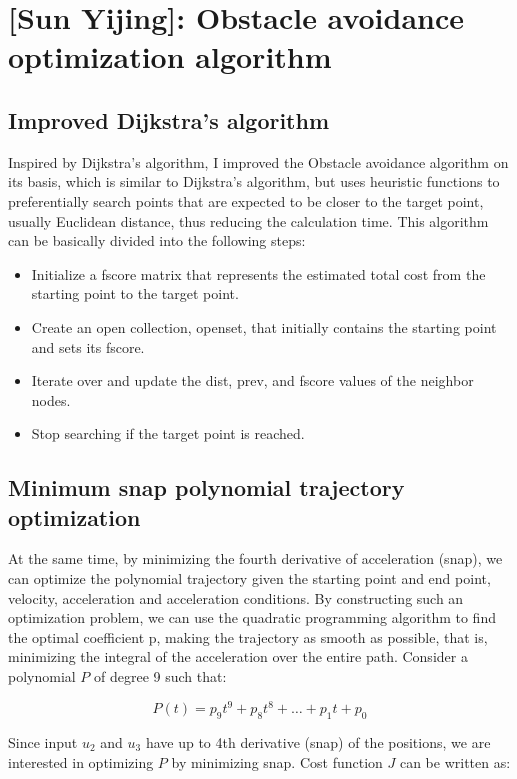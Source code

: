 \documentclass[12pt]{article}
\begin{document}
\section{[Sun Yijing]: Obstacle avoidance optimization algorithm}
\subsection{Improved Dijkstra's algorithm}

Inspired by Dijkstra's algorithm, I improved the Obstacle avoidance algorithm on its basis, which is similar to Dijkstra's algorithm, but uses heuristic functions to preferentially search points that are expected to be closer to the target point, usually Euclidean distance, thus reducing the calculation time. This algorithm can be basically divided into the following steps:
\begin{itemize}
    \item Initialize a fscore matrix that represents the estimated total cost from the starting point to the target point.
    \item Create an open collection, openset, that initially contains the starting point and sets its fscore.
    \item Iterate over and update the dist, prev, and fscore values of the neighbor nodes.
    \item Stop searching if the target point is reached.
\end{itemize}

\subsection{Minimum snap polynomial trajectory optimization}

At the same time, by minimizing the fourth derivative of acceleration (snap), we can optimize the polynomial trajectory given the starting point and end point, velocity, acceleration and acceleration conditions.
By constructing such an optimization problem, we can use the quadratic programming algorithm to find the optimal coefficient p, making the trajectory as smooth as possible, that is, minimizing the integral of the acceleration over the entire path.
Consider a polynomial $P$ of degree 9 such that:

\begin{equation}
    P(t) = p_9t^9 + p_8t^8 + \ldots + p_1t + p_0
\end{equation}

Since input $u_2$ and $u_3$ have up to 4th derivative (snap) of the positions, we are interested in optimizing $P$ by minimizing snap. Cost function $J$ can be written as:
\end{document}
